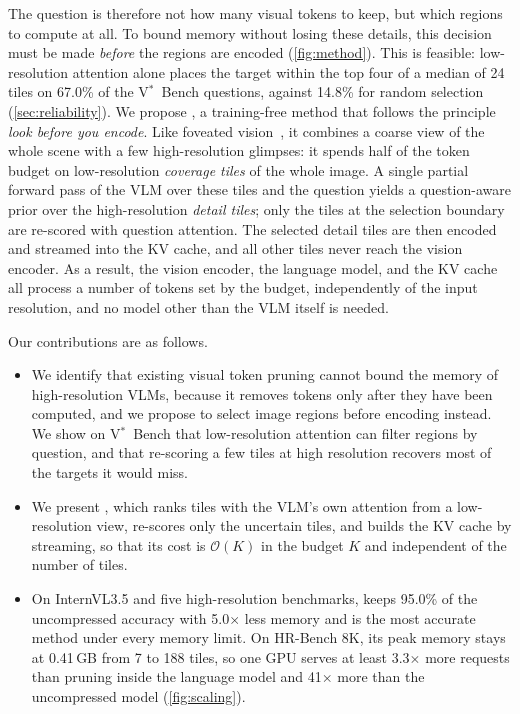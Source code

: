 The question is therefore not how many visual tokens to keep, but which regions to compute at all. To
bound memory without losing these details, this decision must be made \emph{before} the regions are
encoded (\cref{fig:method}). This is feasible: low-resolution attention alone places the target within the top four of a median of 24 tiles on 67.0\% of the V$^*$~Bench questions, against 14.8\% for random selection
(\cref{sec:reliability}). We propose \method, a training-free method that follows the principle
\emph{look before you encode}. Like foveated vision~\cite{ram,glancefocus}, it combines a coarse view of
the whole scene with a few high-resolution glimpses: it spends half of the token budget on
low-resolution \emph{coverage tiles} of the whole image. A single partial forward pass of the VLM over
these tiles and the question yields a question-aware prior over the high-resolution \emph{detail tiles};
only the tiles at the selection boundary are re-scored with question attention. The selected detail
tiles are then encoded and streamed into the KV cache, and all other tiles never reach the vision
encoder. As a result, the vision encoder, the language model, and the KV cache all process a number of
tokens set by the budget, independently of the input resolution, and no model other than the VLM
itself is needed.

Our contributions are as follows.
\begin{itemize}
  \item We identify that existing visual token pruning cannot bound the memory of high-resolution VLMs,
        because it removes tokens only after they have been computed, and we propose to select image
        regions before encoding instead. We show on V$^*$~Bench that low-resolution attention can filter
        regions by question, and that re-scoring a few tiles at high resolution recovers most of the targets
        it would miss.
  \item We present \method, which ranks tiles with the VLM's own attention from a low-resolution view,
        re-scores only the uncertain tiles, and builds the KV cache by streaming, so that its cost is
        $\mathcal{O}(K)$ in the budget $K$ and independent of the number of tiles.
  \item On InternVL3.5 and five high-resolution benchmarks, \method keeps 95.0\% of the uncompressed
        accuracy with 5.0$\times$ less memory and is the most accurate method under every memory limit. On
        HR-Bench 8K, its peak memory stays at 0.41\,GB from 7 to 188 tiles, so one GPU serves at least 3.3$\times$ more
        requests than pruning inside the language model and 41$\times$ more than the uncompressed model
        (\cref{fig:scaling}).
\end{itemize}
